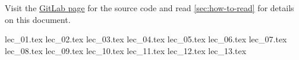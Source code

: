 \documentclass[10pt,english,a4paper, fancyfoot, git]{mkessler-script}
\author{Maximilian Keßler}
\begin{document}
\maketitle
\vfill
\doclicenseThis
Visit the
\href{https://gitlab.com/latexci/lecture-notes-bonn/topology-2}{GitLab page}
for the source code and read
\autoref{sec:how-to-read}
for details on this document.

\cleardoublepage
\tableofcontents

\cleardoublepage
\listoflecture

\cleardoublepage

    {lec_01.tex}
    {lec_02.tex}
    {lec_03.tex}
    {lec_04.tex}
    {lec_05.tex}
    {lec_06.tex}
    {lec_07.tex}
    {lec_08.tex}
    {lec_09.tex}
    {lec_10.tex}
    {lec_11.tex}
    {lec_12.tex}
    {lec_13.tex}

\appendix

\cleardoublepage


\cleardoublepage


\cleardoublepage


\cleardoublepage


\cleardoublepage
\printbibliography

\printvocabindex
\end{document}
